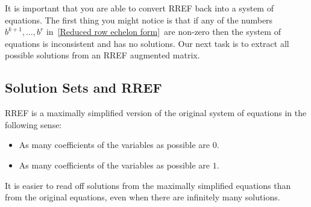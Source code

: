 
It is important that you are able to convert RREF back into a system of equations. The first thing you might notice is that
if any of the numbers 
$b^{k+1},\dots, b^r$ in~\ref{Reduced row echelon form}~are non-zero then the system of equations is inconsistent and has no solutions. 
Our next task is to extract all possible solutions from an RREF  augmented matrix.

\subsection{Solution Sets and RREF}
RREF is a maximally simplified version of the original system of equations in the following sense: 
\begin{itemize}
\item As many coefficients of the variables as possible are $0$. 
\item As many coefficients  of the variables as possible are $1$.
\end{itemize}
It is easier to read off solutions from the maximally simplified equations than from the original equations, even when there are infinitely many solutions.

